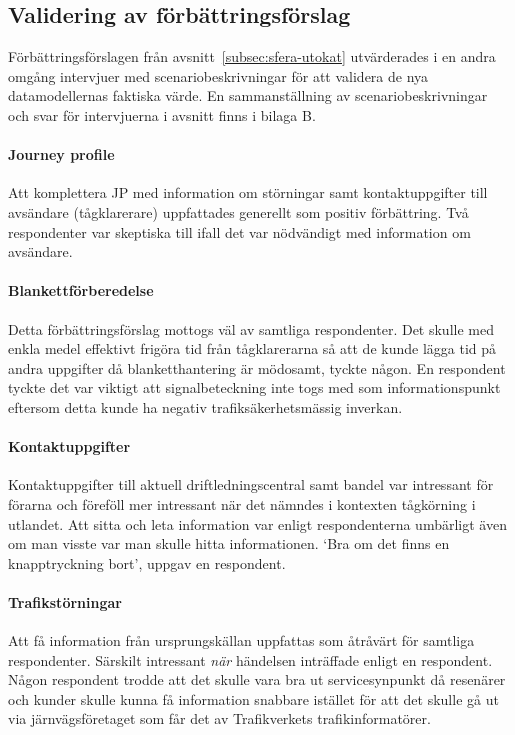 \subsection{Validering av förbättringsförslag}\label{subsec:validering}
Förbättringsförslagen från avsnitt~\ref{subsec:sfera-utokat} utvärderades i en andra omgång intervjuer med scenariobeskrivningar för att validera de nya datamodellernas faktiska värde.
En sammanställning av scenariobeskrivningar och svar för intervjuerna i avsnitt finns i bilaga B.
\paragraph{Journey profile}
Att komplettera JP med information om störningar samt kontaktuppgifter till avsändare (tågklarerare) uppfattades generellt som positiv förbättring.
Två respondenter var skeptiska till ifall det var nödvändigt med information om avsändare.
\paragraph{Blankettförberedelse}
Detta förbättringsförslag mottogs väl av samtliga respondenter.
Det skulle med enkla medel effektivt frigöra tid från tågklarerarna så att de kunde lägga tid på andra uppgifter då blanketthantering är mödosamt, tyckte någon.
En respondent tyckte det var viktigt att signalbeteckning inte togs med som informationspunkt eftersom detta kunde ha negativ trafiksäkerhetsmässig inverkan.
\paragraph{Kontaktuppgifter}
Kontaktuppgifter till aktuell driftledningscentral samt bandel var intressant för förarna och föreföll mer intressant när det nämndes i kontexten tågkörning i utlandet.
Att sitta och leta information var enligt respondenterna umbärligt även om man visste var man skulle hitta informationen.
\lq{}Bra om det finns en knapptryckning bort\rq{}, uppgav en respondent.
\paragraph{Trafikstörningar}
Att få information från ursprungskällan uppfattas som åtråvärt för samtliga respondenter.
Särskilt intressant \emph{när} händelsen inträffade enligt en respondent.
Någon respondent trodde att det skulle vara bra ut servicesynpunkt då resenärer och kunder skulle kunna få information snabbare istället för att det skulle gå ut via järnvägsföretaget som får det av Trafikverkets trafikinformatörer.
